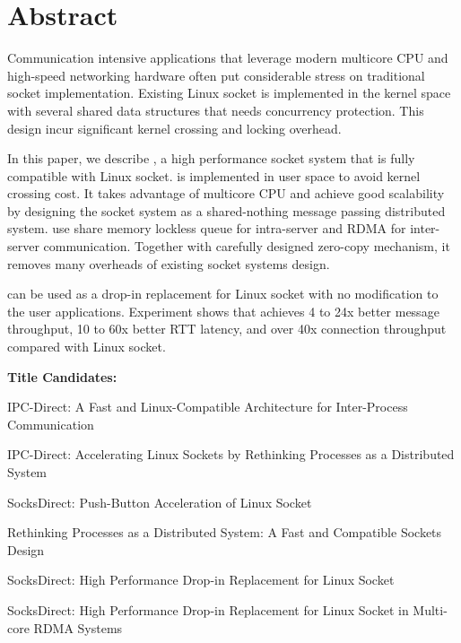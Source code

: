 \section*{Abstract}
Communication intensive applications that leverage modern multicore CPU and high-speed networking hardware often put 
considerable stress on traditional socket implementation. Existing Linux socket is implemented in the kernel 
space with several shared data structures that needs concurrency protection. This design incur significant kernel crossing 
and locking overhead. 

In this paper, we describe \sys{}, a high performance socket system that is fully compatible with Linux socket. 
\sys{} is implemented in user space to avoid kernel crossing cost. It takes advantage of multicore CPU and achieve
good scalability by designing the socket system as a shared-nothing message passing distributed system.
\sys{} use share memory lockless queue for intra-server and RDMA for inter-server communication. Together with carefully 
designed zero-copy mechanism, it removes many overheads of existing socket systems design. 

\sys{} can be used as a drop-in replacement for Linux socket with no modification to the user applications. 
Experiment shows that \sys achieves 4 to 24x better message throughput, 10 to 60x better RTT latency, and over 40x connection 
throughput compared with Linux socket. 


\iffalse
\textbf{Title Candidates:}


IPC-Direct: A Fast and Linux-Compatible Architecture for Inter-Process Communication



IPC-Direct: Accelerating Linux Sockets by Rethinking Processes as a Distributed System

SocksDirect: Push-Button Acceleration of Linux Socket

Rethinking Processes as a Distributed System: A Fast and Compatible Sockets Design

SocksDirect: High Performance Drop-in Replacement for Linux Socket

SocksDirect: High Performance Drop-in Replacement for Linux Socket in Multi-core RDMA Systems


